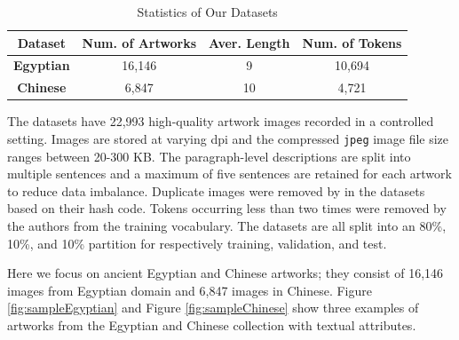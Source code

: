 \begin{table}[h!]
\centering
\begin{tabular}{|c|c|c|c|}
\hline
\textbf{Dataset}          & \textbf{Num. of Artworks} & \textbf{Aver. Length} & \textbf{Num. of Tokens} \\ \hline
\textbf{Egyptian} & 16,146                       & 9                       & 10,694                     \\ \hline
\textbf{Chinese}  & 6,847                        & 10                      & 4,721                      \\ \hline
\end{tabular}
\caption{Statistics of Our Datasets \cite{artworkcaption}}
\label{fig:datasetstats}
\end{table}

The datasets have 22,993 high-quality artwork images recorded
in a controlled setting. Images are stored at varying dpi and the
compressed \verb|jpeg| image file size ranges between 20-300 KB. The paragraph-level descriptions are split into multiple sentences and a maximum of five sentences are retained for each artwork to reduce data imbalance. Duplicate images were removed by \cite{artworkcaption} in the datasets based on their hash code. Tokens occurring less than two times were removed by the authors from the training vocabulary.
The datasets are all split into an 80\%, 10\%, and 10\% partition for respectively training, validation, and test.


Here we focus on ancient Egyptian and Chinese artworks; 
they consist of 16,146 images from Egyptian domain and 6,847 images in Chinese. Figure \ref{fig:sampleEgyptian} and Figure \ref{fig:sampleChinese} show three examples of artworks from the Egyptian and Chinese collection with textual attributes.


